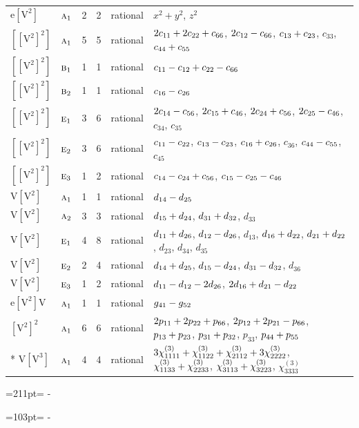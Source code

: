 \documentclass[10pt,a4paper]{article}
\newcommand{\needspace}[1]{\par\penalty-100\begingroup\dimen0=#1\relax\dimen2=\pagegoal
  \advance\dimen2-\pagetotal\ifdim\dimen0>\dimen2\relax\ifdim\dimen2>0pt\vfil\break\fi\fi
  \endgroup}
\numberwithin{equation}{section}
\newcommand{\irr}[1]{\text{\normalfont\scshape #1}}
\newcommand{\jahn}[1]{\mathrm{#1}}
\newlength{\fillwidth}\newlength{\cellwidth}\newlength{\colwidth}
\newcommand{\signbreak}{\penalty100\relax}
\begin{document}
{\begin{longtable}{@{}llrrl>{\RaggedRight\arraybackslash}p{\fillwidth}@{}}
$\jahn{e[V^{2}]}$ & $\irr{a}_{1}$ & 2 & 2 & rational & $x^{2} + y^{2}$, $z^{2}$\\
$\jahn{[[V^{2}]^{2}]}$ & $\irr{a}_{1}$ & 5 & 5 & rational & $2c_{11} +\signbreak 2c_{22} +\signbreak c_{66}$, $2c_{12} -\signbreak c_{66}$, $c_{13} +\signbreak c_{23}$, $c_{33}$, $c_{44} +\signbreak c_{55}$\\
$\jahn{[[V^{2}]^{2}]}$ & $\irr{b}_{1}$ & 1 & 1 & rational & $c_{11} -\signbreak c_{12} +\signbreak c_{22} -\signbreak c_{66}$\\
$\jahn{[[V^{2}]^{2}]}$ & $\irr{b}_{2}$ & 1 & 1 & rational & $c_{16} -\signbreak c_{26}$\\
$\jahn{[[V^{2}]^{2}]}$ & $\irr{e}_{1}$ & 3 & 6 & rational & $2c_{14} -\signbreak c_{56}$, $2c_{15} +\signbreak c_{46}$, $2c_{24} +\signbreak c_{56}$, $2c_{25} -\signbreak c_{46}$, $c_{34}$, $c_{35}$\\
$\jahn{[[V^{2}]^{2}]}$ & $\irr{e}_{2}$ & 3 & 6 & rational & $c_{11} -\signbreak c_{22}$, $c_{13} -\signbreak c_{23}$, $c_{16} +\signbreak c_{26}$, $c_{36}$, $c_{44} -\signbreak c_{55}$, $c_{45}$\\
$\jahn{[[V^{2}]^{2}]}$ & $\irr{e}_{3}$ & 1 & 2 & rational & $c_{14} -\signbreak c_{24} +\signbreak c_{56}$, $c_{15} -\signbreak c_{25} -\signbreak c_{46}$\\
$\jahn{V[V^{2}]}$ & $\irr{a}_{1}$ & 1 & 1 & rational & $d_{14} -\signbreak d_{25}$\\
$\jahn{V[V^{2}]}$ & $\irr{a}_{2}$ & 3 & 3 & rational & $d_{15} +\signbreak d_{24}$, $d_{31} +\signbreak d_{32}$, $d_{33}$\\
$\jahn{V[V^{2}]}$ & $\irr{e}_{1}$ & 4 & 8 & rational & $d_{11} +\signbreak d_{26}$, $d_{12} -\signbreak d_{26}$, $d_{13}$, $d_{16} +\signbreak d_{22}$, $d_{21} +\signbreak d_{22}$, $d_{23}$, $d_{34}$, $d_{35}$\\
$\jahn{V[V^{2}]}$ & $\irr{e}_{2}$ & 2 & 4 & rational & $d_{14} +\signbreak d_{25}$, $d_{15} -\signbreak d_{24}$, $d_{31} -\signbreak d_{32}$, $d_{36}$\\
$\jahn{V[V^{2}]}$ & $\irr{e}_{3}$ & 1 & 2 & rational & $d_{11} -\signbreak d_{12} -\signbreak 2d_{26}$, $2d_{16} +\signbreak d_{21} -\signbreak d_{22}$\\
$\jahn{e[V^{2}]V}$ & $\irr{a}_{1}$ & 1 & 1 & rational & $\mathnormal{g}_{41} -\signbreak \mathnormal{g}_{52}$\\
$\jahn{[V^{2}]^{2}}$ & $\irr{a}_{1}$ & 6 & 6 & rational & $2p_{11} +\signbreak 2p_{22} +\signbreak p_{66}$, $2p_{12} +\signbreak 2p_{21} -\signbreak p_{66}$, $p_{13} +\signbreak p_{23}$, $p_{31} +\signbreak p_{32}$, $p_{33}$, $p_{44} +\signbreak p_{55}$\\*
$\jahn{V[V^{3}]}$ & $\irr{a}_{1}$ & 4 & 4 & rational & $3\chi^{(3)}_{1111} +\signbreak \chi^{(3)}_{1122} +\signbreak \chi^{(3)}_{2112} +\signbreak 3\chi^{(3)}_{2222}$, $\chi^{(3)}_{1133} +\signbreak \chi^{(3)}_{2233}$, $\chi^{(3)}_{3113} +\signbreak \chi^{(3)}_{3223}$, $\chi^{(3)}_{3333}$\\
\bottomrule\end{longtable}}
\needspace{211pt}
\needspace{103pt}
\end{document}
